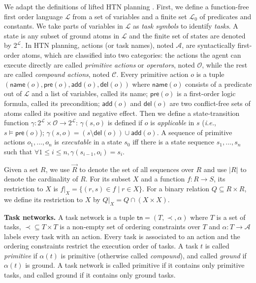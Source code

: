 \documentclass[letterpaper]{article} %
\newcommand{\Actions}{\mathcal{A}}
\newcommand{\Operators}{\mathcal{O}}
\newcommand{\Cactions}{\mathcal{C}}
\newcommand{\Lvar}{\mathcal{L}}
\newcommand{\Constraint}{\prec}
\newcommand{\tn}{\mathsf{tn}}
\newcommand{\pre}{\mathsf{pre}}
\newcommand{\add}{\mathsf{add}}
\newcommand{\del}{\mathsf{del}}
\newcommand{\name}{\mathsf{name}}
\begin{document}
We adapt the definitions of lifted HTN planning \cite{alford2015tighttihtn}.
First, we define a function-free first order language $\Lvar$ from a set of variables and a finite set $\Lvar_0$ of predicates and constants.
We take parts of variables in $\Lvar$ as \emph{task symbols} to identify \emph{tasks}.
A state is any subset of ground atoms in $\Lvar$ and the finite set of states are denoted by $2^\Lvar$.
In HTN planning, actions (or task names), noted $\Actions$, are syntactically first-order atoms,
which are classified into two categories: the actions the agent can execute directly are called \emph{primitive actions} or \emph{operators}, noted $\Operators$, while the rest are called \emph{compound actions}, noted $\Cactions$.
Every primitive action $o$ is a tuple $(\name(o),\pre(o),\add(o),\del(o))$ where %
$\name(o)$ consists of a predicate out of $\Lvar$ and a list of variables, called its name;
$\pre(o)$ is a first-order logic formula, called its precondition; $\add(o)$ and $\del(o)$ are two conflict-free sets of atoms called its positive and negative effect.
Then we define a state-transition function $\gamma: 2^{\Lvar} \times \Operators \longrightarrow 2^{\Lvar}$:
$\gamma(s,o)$ is defined if $o$ is \emph{applicable} in $s$ (\emph{i.e.}, $s \models \pre(o)$);
$\gamma(s,o){=}(s {\setminus} \del(o)) {\cup} \add(o)$.
A sequence of primitive actions $o_1{,}{...}{,}o_n $ is \emph{executable} in a state $s_0$ iff there is a state sequence $s_1{,}{...}{,}s_n$ such that $\forall{1 \leq i \leq n}, \gamma(s_{i-1},o_i) {=} s_i$. %

Given a set $R$, we use $\vec{R}$ to denote the set of all sequences over $R$ and use $|R|$ to denote the cardinality of $R$.
For its subset $X$ and a function $f: R \longrightarrow S$, its restriction to $X$ is
$f |_X = \{(r,s) \in f \mid r \in X\}$.
For a binary relation $Q \subseteq R \times R$, we define
its restriction to $X$ by $Q |_X = Q \cap (X \times X)$.


\smallskip
\noindent\textbf{Task networks.}
A task network  %
is a tuple $\tn {=} (T,\Constraint,\alpha)$ where
$T$ is a set of tasks, $\Constraint\! {\subseteq}  T{\times} T$ is a non-empty set of ordering constraints over $T$ and $\alpha\!:\!T\!\! \longrightarrow\!\! \Actions$ labels every task with an action.
Every task is associated to an action and the ordering constraints restrict the execution order of tasks.
A task $t$ is called \emph{primitive} if $\alpha(t)$ is primitive (otherwise called \emph{compound}), and called \emph{ground} if $\alpha(t)$ is ground.
A task network is called primitive if it contains only primitive tasks, and called ground if it contains only ground tasks.
\end{document}
